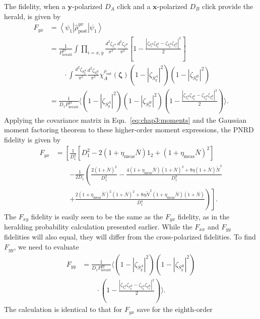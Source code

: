 \documentclass[aps,twocolumn,secnumarabic,amsmath,amssymb,pra,groupedaddress,
showpacs, showkeys]{revtex4-1}
\newcommand{\bra}[1]{\left\langle #1 \right|}
\newcommand{\ket}[1]{\left|#1\right\rangle}
\newcommand{\pna}[1]{\left(#1\right)}
\newcommand{\pnb}[1]{\left[#1\right]}
\begin{document}
The fidelity, when a $\mathbf{y}$-polarized $D_A$ click and a
$\mathbf{x}$-polarized $D_B$ click provide the herald, is given by
\begin{align}
F_{yx} & = \bra{\psi_{1}} \hat{\rho}_{\textrm{post}}^{yx} \ket{\psi_1} \nonumber \\
& =\frac{1}{P_{\textrm{herald}}^{yx}}\int 
\prod_{i=x,y}\frac{d^2 \zeta_{I_i^A}}{\pi^2} 
\frac{d^2 \zeta_{I_i^B}}{\pi^2} 
\pnb{1-\frac{|\zeta_{I_x^A}\zeta_{I_y^B}-\zeta_{I_y^A}\zeta_{I_x^B}|^2}{2}}  \nonumber \\
& \qquad \cdot \int 
\frac{d^2 \zeta_{S_y^A}}{\pi^2} 
\frac{d^2 \zeta_{S_x^B}}{\pi^2}
\chi_A^{\rho_{\textrm{out}}}\pna{\bm{\zeta}} 
\pna{1-|\zeta_{S_y^A}|^2}\pna{1-|\zeta_{S_x^B}|^2} \nonumber \\
& = \frac{1}{D_1 P_{\textrm{herald}}^{yx}}\langle \pna{1-|\zeta_{S_y^A}|^2}\pna{1-|\zeta_{S_x^B}|^2}\pna{1-\frac{|\zeta_{I_x^A}\zeta_{I_y^B}-\zeta_{I_y^A}\zeta_{I_x^B}|^2}{2}}  \rangle.
\end{align}
Applying the covariance matrix in Eqn.~\ref{eq:chap3:moments} and the Gaussian
moment factoring theorem to these higher-order moment expressions, the PNRD
fidelity is given by
\begin{align}
F_{yx}&=\left[\frac{1}{D_1^3}\pnb{D_1^2-2\pna{1+\eta_{\textrm{meas}}\bar{N}}1_2+\pna{1+\eta_{\textrm{meas}}\bar{N}}^2}\right.\nonumber\\
& \qquad \left.-\frac{1}{2D_1} \left(\frac{2\pna{1+\bar{N}}^2}{D_1^2}-\frac{4\pna{1+\eta_{\textrm{meas}}\bar{N}}\pna{1+\bar{N}}^2+8\eta\pna{1+\bar{N}}\tilde{N}^2}{D_1^3}\right.\right.\nonumber\\
& \qquad \left.\left.+\frac{2\pna{1+\eta_{\textrm{meas}}\bar{N}}^2\pna{1+\bar{N}}^2 +8 \eta \tilde{N}^2 \pna{1 + \eta_{\textrm{meas}} \bar{N}} \pna{1 + \bar{N}}}{D_1^4}\right)\right].
\end{align}
The $F_{xy}$ fidelity is easily seen to be the same as the $F_{yx}$ fidelity,
as in the heralding probability calculation presented earlier. While the
$F_{xx}$ and $F_{yy}$ fidelities will also equal, they will differ from the
cross-polarized fidelities. To find $F_{yy}$, we need to evaluate
\begin{align}
F_{yy} & = \frac{1}{D_1 P_{\textrm{herald}}^{yy}}\langle
\pna{1-|\zeta_{S_y^A}|^2}\pna{1-|\zeta_{S_y^B}|^2}\nonumber \\ & \qquad \cdot\pna{1-\frac{|\zeta_{I_x^A}\zeta_{I_y^B}-\zeta_{I_y^A}\zeta_{I_x^B}|^2}{2}}  \rangle.
\end{align}
The calculation is identical to that for $F_{yx}$ save for the eighth-order
\end{document}
